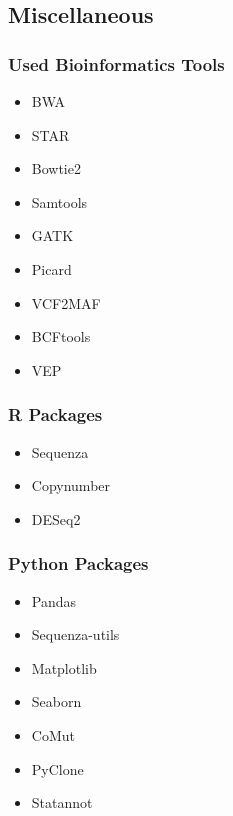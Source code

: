 \documentclass{beamer}
\begin{document}
    \subsection{Miscellaneous}
    \begin{frame}
        \frametitle{Used Bioinformatics Tools}

        \begin{itemize}
            \item BWA \cite{bwa1, bwa2}
            \item STAR \cite{star1}
            \item Bowtie2 \cite{bowtie1}
            \item Samtools \cite{samtools1}
            \item GATK \cite{gatk1, gatk2}
            \item Picard \cite{picard1}
            \item VCF2MAF \cite{vcf2maf1}
            \item BCFtools \cite{bcftools1}
            \item VEP \cite{vep1}
        \end{itemize}
    \end{frame}

    \begin{frame}
        \frametitle{R Packages}

        \begin{itemize}
            \item Sequenza \cite{sequenza1}
            \item Copynumber \cite{copynumber1, copynumber2}
            \item DESeq2 \cite{DESeq1}
        \end{itemize}
    \end{frame}

    \begin{frame}
        \frametitle{Python Packages}

        \begin{itemize}
            \item Pandas \cite{pandas1, pandas2}
            \item Sequenza-utils \cite{sequenza1}
            \item Matplotlib \cite{matplotlib1}
            \item Seaborn \cite{seaborn1}
            \item CoMut \cite{comut1}
            \item PyClone \cite{pyclone1}
            \item Statannot
        \end{itemize}
    \end{frame}
\end{document}
